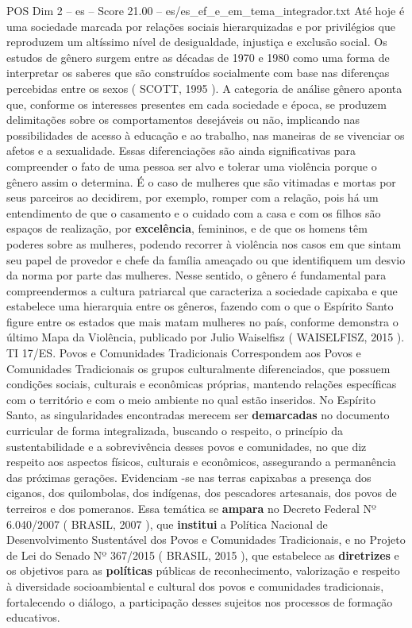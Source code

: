 \begin{textsample}{POS Dim 2 – es – Score 21.00 – es/es\_ef\_e\_em\_tema\_integrador.txt}
Até hoje é uma sociedade marcada por relações sociais hierarquizadas e por privilégios que reproduzem um altíssimo nível de desigualdade, injustiça e exclusão social.
Os estudos de gênero surgem entre as décadas de 1970 e 1980 como uma forma de interpretar os saberes que são construídos socialmente com base nas diferenças percebidas entre os sexos ( SCOTT, 1995 ).
A categoria de análise gênero aponta que, conforme os interesses presentes em cada sociedade e época, se produzem delimitações sobre os comportamentos desejáveis ou não, implicando nas possibilidades de acesso à educação e ao trabalho, nas maneiras de se vivenciar os afetos e a sexualidade.
Essas diferenciações são ainda significativas para compreender o fato de uma pessoa ser alvo e tolerar uma violência porque o gênero assim o determina.
É o caso de mulheres que são vitimadas e mortas por seus parceiros ao decidirem, por exemplo, romper com a relação, pois há um entendimento de que o casamento e o cuidado com a casa e com os filhos são espaços de realização, por \textbf{excelência}, femininos, e de que os homens têm poderes sobre as mulheres, podendo recorrer à violência nos casos em que sintam seu papel de provedor e chefe da família ameaçado ou que identifiquem um desvio da norma por parte das mulheres.
Nesse sentido, o gênero é fundamental para compreendermos a cultura patriarcal que caracteriza a sociedade capixaba e que estabelece uma hierarquia entre os gêneros, fazendo com o que o Espírito Santo figure entre os estados que mais matam mulheres no país, conforme demonstra o último Mapa da Violência, publicado por Julio Waiselfisz ( WAISELFISZ, 2015 ).
TI 17/ES.
Povos e Comunidades Tradicionais Correspondem aos Povos e Comunidades Tradicionais os grupos culturalmente diferenciados, que possuem condições sociais, culturais e econômicas próprias, mantendo relações específicas com o território e com o meio ambiente no qual estão inseridos.
No Espírito Santo, as singularidades encontradas merecem ser \textbf{demarcadas} no documento curricular de forma integralizada, buscando o respeito, o princípio da sustentabilidade e a sobrevivência desses povos e comunidades, no que diz respeito aos aspectos físicos, culturais e econômicos, assegurando a permanência das próximas gerações.
Evidenciam -se nas terras capixabas a presença dos ciganos, dos quilombolas, dos indígenas, dos pescadores artesanais, dos povos de terreiros e dos pomeranos.
Essa temática se \textbf{ampara} no Decreto Federal Nº 6.040/2007 ( BRASIL, 2007 ), que \textbf{institui} a Política Nacional de Desenvolvimento Sustentável dos Povos e Comunidades Tradicionais, e no Projeto de Lei do Senado Nº 367/2015 ( BRASIL, 2015 ), que estabelece as \textbf{diretrizes} e os objetivos para as \textbf{políticas} públicas de reconhecimento, valorização e respeito à diversidade socioambiental e cultural dos povos e comunidades tradicionais, fortalecendo o diálogo, a participação desses sujeitos nos processos de formação educativos.

\end{textsample}
